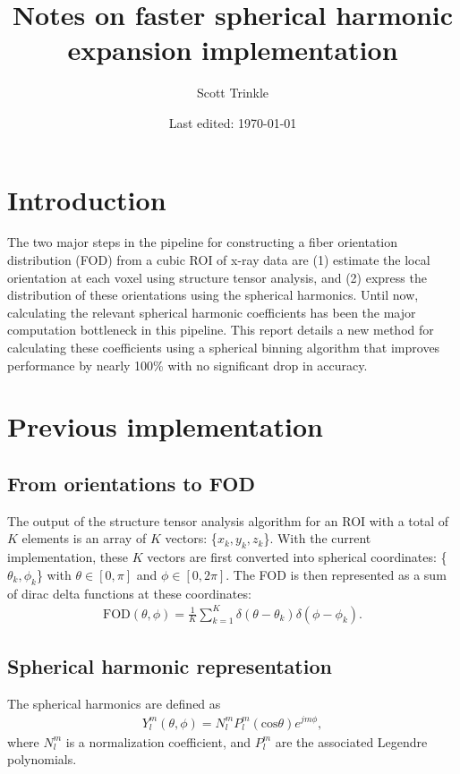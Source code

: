 \documentclass{article}
\title{Notes on faster spherical harmonic expansion implementation}
\author{Scott Trinkle}
\date{Last edited: \today}
\begin{document}
\maketitle

\section{Introduction}
The two major steps in the pipeline for constructing a fiber orientation
distribution (FOD) from a cubic ROI of x-ray \uct data are (1) estimate the
local orientation at each voxel using structure tensor analysis, and (2) express
the distribution of these orientations using the spherical harmonics. Until now,
calculating the relevant spherical harmonic coefficients has been the major
computation bottleneck in this pipeline. This report details a new method for
calculating these coefficients using a spherical binning algorithm that improves
performance by nearly 100\% with no significant drop in accuracy.

\section{Previous implementation}
\subsection{From orientations to FOD}
The output of the structure tensor analysis algorithm for an ROI with a total of
$K$ elements is an array of $K$ vectors: \{$x_k, y_k, z_k$\}. With the current
implementation, these $K$ vectors are first converted into spherical
coordinates: \{$\theta_k, \phi_k$\} with $\theta \in [0, \pi]$ and
$\phi \in [0, 2\pi]$. The FOD is then represented as a sum of dirac delta
functions at these coordinates:
\begin{align}
  \label{eq:1}
  \text{FOD}(\theta, \phi) = \frac{1}{K}\sum_{k=1}^K \delta(\theta - \theta_k)\delta(\phi - \phi_k).
\end{align}

\subsection{Spherical harmonic representation}
The spherical harmonics are defined as
\begin{align}
  Y_l^m(\theta, \phi) = N_l^m P_l^m(\text{cos}\theta)e^{jm\phi},
\end{align}
where $N_l^m$ is a normalization coefficient, and $P_l^m$ are the
associated Legendre polynomials.
\end{document}
